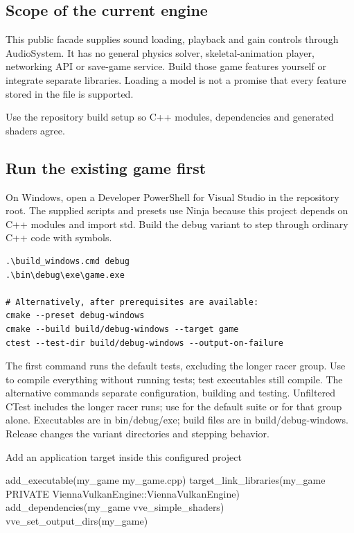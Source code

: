 \documentclass[11pt,a4paper]{article}
\begin{document}
\subsection*{Scope of the current engine}
This public facade supplies sound loading, playback and gain controls through AudioSystem. It has no general physics solver, skeletal-animation player, networking API or save-game service. Build those game features yourself or integrate separate libraries. Loading a model is not a promise that every feature stored in the file is supported.

\label{core-53}
Use the repository build setup so C++ modules, dependencies and generated shaders agree.

\subsection*{Run the existing game first}
On Windows, open a Developer PowerShell for Visual Studio in the repository root. The supplied scripts and presets use Ninja because this project depends on C++ modules and import std. Build the debug variant to step through ordinary C++ code with symbols.

\begin{lstlisting}[language={}]
.\build_windows.cmd debug
.\bin\debug\exe\game.exe

# Alternatively, after prerequisites are available:
cmake --preset debug-windows
cmake --build build/debug-windows --target game
ctest --test-dir build/debug-windows --output-on-failure
\end{lstlisting}

The first command runs the default tests, excluding the longer racer group. Use  to compile everything without running tests; test executables still compile. The alternative commands separate configuration, building and testing. Unfiltered CTest includes the longer racer runs; use  for the default suite or  for that group alone. Executables are in bin/debug/exe; build files are in build/debug-windows. Release changes the variant directories and stepping behavior.

Add an application target inside this configured project

add\_executable(my\_game my\_game.cpp) target\_link\_libraries(my\_game PRIVATE ViennaVulkanEngine::ViennaVulkanEngine) add\_dependencies(my\_game vve\_simple\_shaders) vve\_set\_output\_dirs(my\_game)
\end{document}
